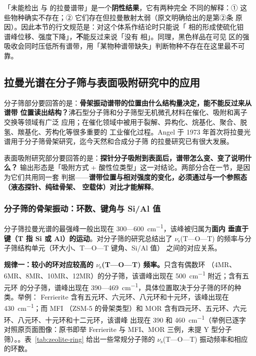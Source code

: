 \begin{pitfall}
「未能检出  与  的拉曼谱带」是一个\textbf{阴性结果}，它有两种完全
不同的解释：① 这些物种确实不存在；② 它们存在但拉曼散射太弱（原文明确给出的是第②条
原因）。因此本节的行文规范是：对这个体系作结论时只能说「 相的形成使硫化钼
谱峰位移、强度下降」，\textbf{不}能反过来说「没有  相」。同理，黑色样品在可见
区的强吸收会同时压低所有谱带，用「某物种谱带缺失」判断物种不存在在这里最不可靠。
\end{pitfall}

\subsection{拉曼光谱在分子筛与表面吸附研究中的应用}

\begin{probout}
分子筛部分要回答的是：\textbf{骨架振动谱带的位置由什么结构量决定，能不能反过来从谱带
位置读出结构？}沸石型分子筛和分子筛型无机微孔材料在催化、吸附和离子交换等领域有广泛
应用；在催化领域中被用于裂解、异构化、烷基化、聚合、脱氢、羰基化、芳构化等很多重要的
工业催化过程。Angel 于 1973 年首次将拉曼光谱用于分子筛骨架研究，迄今天然和合成分子筛
的拉曼研究已有很大发展。

表面吸附研究部分要回答的是：\textbf{探针分子吸附到表面后，谱带怎么变、变了说明什么？}
输出形态是「吸附方式 + 酸性位类型」这一对结论。两部分合在一节，是因为它们共用同一套
判据——\textbf{谱带位置与相对强度的变化，必须通过与一个参照态（液态探针、纯硅骨架、
空载体）对比才能解释}。
\end{probout}

\subsubsection{分子筛的骨架振动：环数、键角与 Si/Al 值}

分子筛拉曼光谱的最强峰一般出现在 300—\qty{600}{cm^{-1}}，该峰被归属为\textbf{面内
垂直于  键（T 指 Si 或 Al）的运动}。对分子筛的研究总结出了
$\nu_{\mathrm{s}}$(T—O—T) 的频率与分子筛结构单元（环大小、T—O—T 键角、Si/Al 值）
之间的对应关系。

\textbf{规律一：较小的环对应较高的 $\nu_{\mathrm{s}}$(T—O—T) 频率。}只含有偶数环
（4MR、6MR、8MR、10MR、12MR）的分子筛，该谱峰出现在 \qty{500}{cm^{-1}} 附近；含有五元环
的分子筛，谱峰出现在 390—\qty{469}{cm^{-1}}，具体位置取决于分子筛的环的种类。举例：
Ferrierite 含有五元环、六元环、八元环和十元环，该峰出现在 \qty{430}{cm^{-1}}；而 MFI
（ZSM-5 的骨架类型）和 MOR 含有四元环、五元环、六元环、八元环、十元环和十二元环，该谱峰
出现在 390 和 \qty{460}{cm^{-1}}（举例已逐字对照原页面图像：原书即举 Ferrierite 与
MFI、MOR 三例，未提 Y 型分子筛）。。表~\ref{tab:zeolite-ring}
给出一些常规分子筛的 $\nu_{\mathrm{s}}$(T—O—T) 振动频率和相应的环数。

